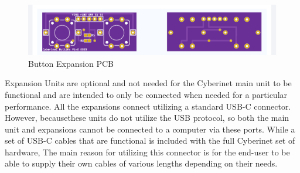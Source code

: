 \begin{center}
    \begin{figure}
        \centering
        \includegraphics[scale=0.5]{diagrams/PCBs/buttons1.2.png}
        \caption{Button Expansion PCB}
        \label{fig:buttonPCB}
    \end{figure}
\end{center}


Expansion Units are optional and not needed for the Cyberinet main unit to be functional and are intended to only be connected when needed for a particular performance. All the expansions connect utilizing a standard USB-C connector. However, becausethese units do not utilize the USB protocol, so both the main unit and expansions cannot be connected to a computer via these ports. While a set of USB-C cables that are functional is included with the full Cyberinet set of hardware, The main reason for utilizing this connector is for the end-user to be able to supply their own cables of various lengths depending on their needs. 



